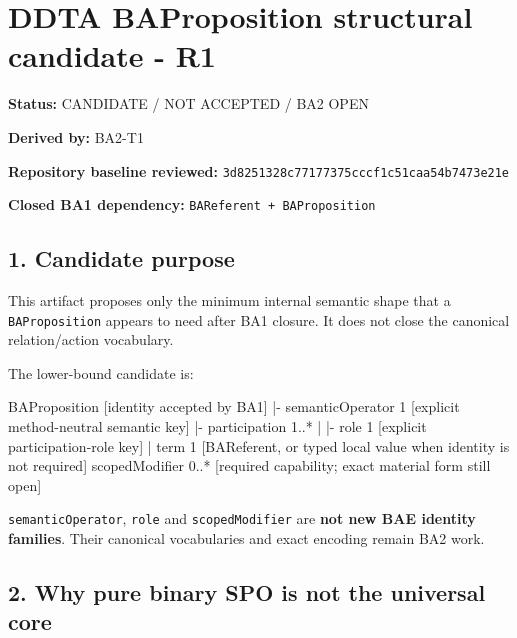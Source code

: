 \documentclass[
  10pt,
  letterpaper,
]{article}
\author{}
\date{}
\newenvironment{Shaded}{}{}
\newcommand{\NormalTok}[1]{#1}
\begin{document}
\section{DDTA BAProposition structural candidate -
R1}\label{ddta-baproposition-structural-candidate---r1}

\textbf{Status:} CANDIDATE / NOT ACCEPTED / BA2 OPEN

\textbf{Derived by:} BA2-T1

\textbf{Repository baseline reviewed:}
\texttt{3d8251328c77177375cccf1c51caa54b7473e21e}

\textbf{Closed BA1 dependency:} \texttt{BAReferent\ +\ BAProposition}

\subsection{1. Candidate purpose}\label{candidate-purpose}

This artifact proposes only the minimum internal semantic shape that a
\texttt{BAProposition} appears to need after BA1 closure. It does not
close the canonical relation/action vocabulary.

The lower-bound candidate is:

\begin{Shaded}
\begin{Highlighting}[]
\NormalTok{BAProposition                         [identity accepted by BA1]}
\NormalTok{|{-} semanticOperator                  1  [explicit method{-}neutral semantic key]}
\NormalTok{|{-} participation                     1..*}
\NormalTok{|    |{-} role                         1  [explicit participation{-}role key]}
\NormalTok{|    \textasciigrave{}{-} term                         1  [BAReferent, or typed local value when identity is not required]}
\NormalTok{\textasciigrave{}{-} scopedModifier                    0..* [required capability; exact material form still open]}
\end{Highlighting}
\end{Shaded}

\texttt{semanticOperator}, \texttt{role} and \texttt{scopedModifier} are
\textbf{not new BAE identity families}. Their canonical vocabularies and
exact encoding remain BA2 work.

\subsection{2. Why pure binary SPO is not the universal
core}\label{why-pure-binary-spo-is-not-the-universal-core}
\end{document}
